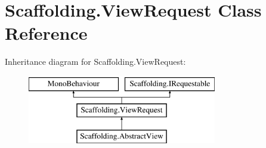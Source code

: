 \hypertarget{class_scaffolding_1_1_view_request}{\section{Scaffolding.\+View\+Request Class Reference}
\label{class_scaffolding_1_1_view_request}
}
Inheritance diagram for Scaffolding.\+View\+Request\+:\begin{figure}[H]
\begin{center}
\leavevmode
\includegraphics[height=3.000000cm]{class_scaffolding_1_1_view_request}
\end{center}
\end{figure}
